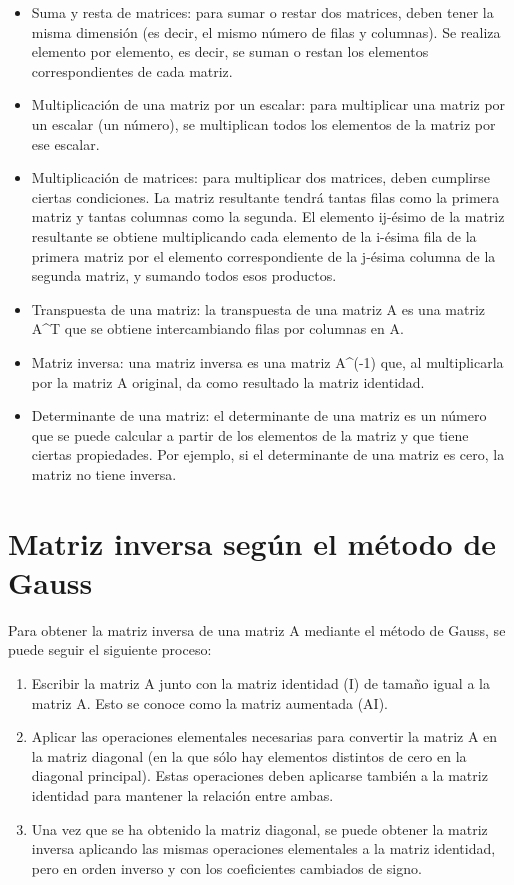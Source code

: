 \documentclass[
  letterpaper,
  DIV=11,
  numbers=noendperiod]{scrreprt}
\theoremstyle{definition}
\theoremstyle{definition}
\theoremstyle{remark}
\begin{document}
\begin{itemize}
\item
  Suma y resta de matrices: para sumar o restar dos matrices, deben
  tener la misma dimensión (es decir, el mismo número de filas y
  columnas). Se realiza elemento por elemento, es decir, se suman o
  restan los elementos correspondientes de cada matriz.
\item
  Multiplicación de una matriz por un escalar: para multiplicar una
  matriz por un escalar (un número), se multiplican todos los elementos
  de la matriz por ese escalar.
\item
  Multiplicación de matrices: para multiplicar dos matrices, deben
  cumplirse ciertas condiciones. La matriz resultante tendrá tantas
  filas como la primera matriz y tantas columnas como la segunda. El
  elemento ij-ésimo de la matriz resultante se obtiene multiplicando
  cada elemento de la i-ésima fila de la primera matriz por el elemento
  correspondiente de la j-ésima columna de la segunda matriz, y sumando
  todos esos productos.
\item
  Transpuesta de una matriz: la transpuesta de una matriz A es una
  matriz A\^{}T que se obtiene intercambiando filas por columnas en A.
\item
  Matriz inversa: una matriz inversa es una matriz A\^{}(-1) que, al
  multiplicarla por la matriz A original, da como resultado la matriz
  identidad.
\item
  Determinante de una matriz: el determinante de una matriz es un número
  que se puede calcular a partir de los elementos de la matriz y que
  tiene ciertas propiedades. Por ejemplo, si el determinante de una
  matriz es cero, la matriz no tiene inversa.
\end{itemize}

\hypertarget{matriz-inversa-seguxfan-el-muxe9todo-de-gauss}{%
\section{Matriz inversa según el método de
Gauss}\label{matriz-inversa-seguxfan-el-muxe9todo-de-gauss}}

Para obtener la matriz inversa de una matriz A mediante el método de
Gauss, se puede seguir el siguiente proceso:

\begin{enumerate}
\def\labelenumi{\arabic{enumi}.}
\item
  Escribir la matriz A junto con la matriz identidad (I) de tamaño igual
  a la matriz A. Esto se conoce como la matriz aumentada (A\textbar I).
\item
  Aplicar las operaciones elementales necesarias para convertir la
  matriz A en la matriz diagonal (en la que sólo hay elementos distintos
  de cero en la diagonal principal). Estas operaciones deben aplicarse
  también a la matriz identidad para mantener la relación entre ambas.
\item
  Una vez que se ha obtenido la matriz diagonal, se puede obtener la
  matriz inversa aplicando las mismas operaciones elementales a la
  matriz identidad, pero en orden inverso y con los coeficientes
  cambiados de signo.
\end{enumerate}
\end{document}
